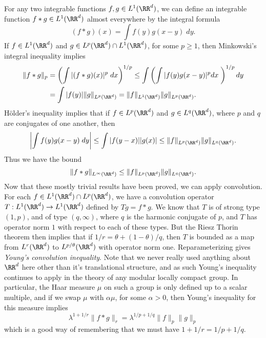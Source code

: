 \begin{example}
  For any two integrable functions $f,g \in L^1(\RR^d)$, we can define an integrable function $f * g \in L^1(\RR^d)$ almost everywhere by the integral formula
  \[ (f * g)(x) = \int f(y) g(x-y)\; dy. \]
  If $f \in L^1(\RR^d)$ and $g \in L^p(\RR^d) \cap L^1(\RR^d)$, for some $p \geq 1$, then Minkowski's integral inequality implies
  \begin{align*}
      \| f * g \|_p &= \left( \int |(f * g)(x)|^p\; dx \right)^{1/p} \leq \int \left( \int |f(y)g(x-y)|^p dx\; \right)^{1/p} dy\\
      &= \int |f(y)| \| g \|_{L^p(\RR^d)} = \| f \|_{L^1(\RR^d)} \| g \|_{L^p(\RR^d)}.
  \end{align*}
  H\"{o}lder's inequality implies that if $f \in L^p(\RR^d)$ and $g \in L^q(\RR^d)$, where $p$ and $q$ are conjugates of one another, then
  \begin{align*}
    \left| \int f(y) g(x-y)\; dy \right| \leq \int |f(y-x)| |g(x)| \leq \| f \|_{L^p(\RR^d)} \| g \|_{L^q(\RR^d)}.
  \end{align*}
    Thus we have the bound
    \[ \| f * g \|_{L^\infty(\RR^d)} \leq \| f \|_{L^p(\RR^d)} \| g \|_{L^q(\RR^d)}. \]
    Now that these mostly trivial results have been proved, we can apply convolution. For each $f \in L^1(\RR^d) \cap L^p(\RR^d)$, we have a convolution operator $T: L^1(\RR^d) \to L^1(\RR^d)$ defined by $Tg = f * g$. We know that $T$ is of strong type $(1,p)$, and of type $(q,\infty)$, where $q$ is the harmonic conjugate of $p$, and $T$ has operator norm $1$ with respect to each of these types. But the Riesz Thorin theorem then implies that if $1/r = \theta + (1 - \theta)/q$, then $T$ is bounded as a map from $L^r(\RR^d)$ to $L^{p/\theta}(\RR^d)$ with operator norm one. Reparameterizing gives \emph{Young's convolution inequality}. Note that we never really used anything about $\RR^d$ here other than it's translational structure, and as such Young's inequality continues to apply in the theory of any modular locally compact group. In particular, the Haar measure $\mu$ on such a group is only defined up to a scalar multiple, and if we swap $\mu$ with $\alpha \mu$, for some $\alpha > 0$, then Young's inequality for this measure implies
    \[ \lambda^{1 + 1/r} \| f * g \|_r = \lambda^{1/p + 1/q} \| f \|_p \| g \|_p \]
    which is a good way of remembering that we must have $1 + 1/r = 1/p + 1/q$.
\end{example}

